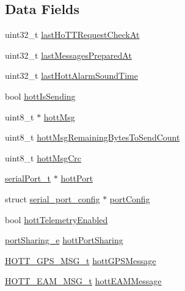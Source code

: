 \subsection*{Data Fields}
\begin{DoxyCompactItemize}
\item 
uint32\+\_\+t \hyperlink{structhott_a9515a156e9ac0cb17dab598b44ecc1cc}{last\+Ho\+T\+T\+Request\+Check\+At}
\item 
uint32\+\_\+t \hyperlink{structhott_a161f29f2e2fbf636d7ef73a113a1a51a}{last\+Messages\+Prepared\+At}
\item 
uint32\+\_\+t \hyperlink{structhott_ad76603535b91ce456b54c8e27751ff7b}{last\+Hott\+Alarm\+Sound\+Time}
\item 
bool \hyperlink{structhott_afea5e8a740c8d36689c1aa141364cc37}{hott\+Is\+Sending}
\item 
uint8\+\_\+t $\ast$ \hyperlink{structhott_a2ef7c23deaf5b2feccc549710f3de3db}{hott\+Msg}
\item 
uint8\+\_\+t \hyperlink{structhott_af62c87d592cf1500e1755151830fb218}{hott\+Msg\+Remaining\+Bytes\+To\+Send\+Count}
\item 
uint8\+\_\+t \hyperlink{structhott_aefc0dd2fe3dbaaa38d1d045a82acd7ca}{hott\+Msg\+Crc}
\item 
\hyperlink{drivers_2serial_8h_a64a5e2f04e1a908fbb1b3b165f88e0ef}{serial\+Port\+\_\+t} $\ast$ \hyperlink{structhott_aa15d75608c63aa00e6ca0f2ef8fb3dbf}{hott\+Port}
\item 
struct \hyperlink{structserial__port__config}{serial\+\_\+port\+\_\+config} $\ast$ \hyperlink{structhott_a02eb8255643fae88335061e5100c4375}{port\+Config}
\item 
bool \hyperlink{structhott_a7ff07a115d9b58ea2985abeb212e9977}{hott\+Telemetry\+Enabled}
\item 
\hyperlink{config_2serial_8h_abf0b69624c13c172601595b52e672022}{port\+Sharing\+\_\+e} \hyperlink{structhott_ac6ac82b8c690145e6beec06ce4d1decd}{hott\+Port\+Sharing}
\item 
\hyperlink{telemetry_2hott_8h_ae6def72a29b211874fad6f74fa8bf4e8}{H\+O\+T\+T\+\_\+\+G\+P\+S\+\_\+\+M\+S\+G\+\_\+t} \hyperlink{structhott_aef8c209abf90904dff60ee056ffebf53}{hott\+G\+P\+S\+Message}
\item 
\hyperlink{telemetry_2hott_8h_aa6cb9b407d05356bd97bcbacceac12f9}{H\+O\+T\+T\+\_\+\+E\+A\+M\+\_\+\+M\+S\+G\+\_\+t} \hyperlink{structhott_af920cbcbc98ed6ad67de8fa4974faf57}{hott\+E\+A\+M\+Message}
\end{DoxyCompactItemize}


